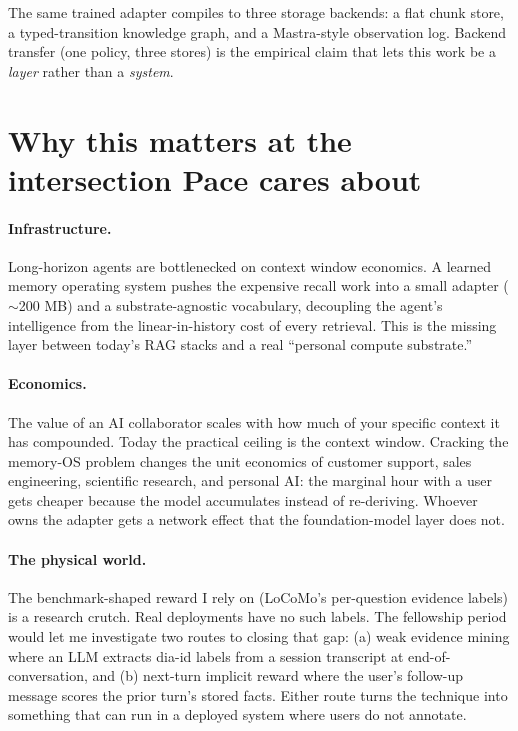 \documentclass[11pt]{article}
\begin{document}
The same trained adapter compiles to three storage backends: a flat
chunk store, a typed-transition knowledge graph, and a Mastra-style
observation log. Backend transfer (one policy, three stores) is the
empirical claim that lets this work be a \emph{layer} rather than a
\emph{system}.

\section*{Why this matters at the intersection Pace cares about}

\paragraph{Infrastructure.} Long-horizon agents are bottlenecked on
context window economics. A learned memory operating system pushes the
expensive recall work into a small adapter ($\sim$200 MB) and a
substrate-agnostic vocabulary, decoupling the agent's intelligence from
the linear-in-history cost of every retrieval. This is the missing layer
between today's RAG stacks and a real ``personal compute substrate.''

\paragraph{Economics.} The value of an AI collaborator scales with how
much of your specific context it has compounded. Today the practical
ceiling is the context window. Cracking the memory-OS problem changes
the unit economics of customer support, sales engineering, scientific
research, and personal AI: the marginal hour with a user gets cheaper
because the model accumulates instead of re-deriving. Whoever owns the
adapter gets a network effect that the foundation-model layer does not.

\paragraph{The physical world.} The benchmark-shaped reward I rely on
(LoCoMo's per-question evidence labels) is a research crutch. Real
deployments have no such labels. The fellowship period would let me
investigate two routes to closing that gap: (a) weak evidence mining
where an LLM extracts dia-id labels from a session transcript at
end-of-conversation, and (b) next-turn implicit reward where the user's
follow-up message scores the prior turn's stored facts. Either route
turns the technique into something that can run in a deployed system
where users do not annotate.
\end{document}
